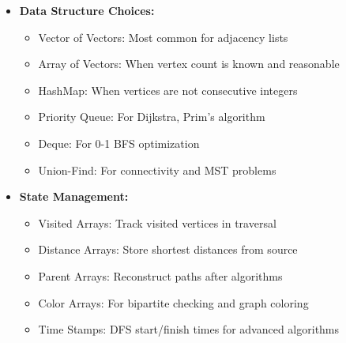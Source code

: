 \documentclass[a4paper,10pt]{book}
\begin{document}
\begin{itemize}[leftmargin=*]
    \item \textbf{Data Structure Choices:}
    \begin{itemize}
        \item Vector of Vectors: Most common for adjacency lists
        \item Array of Vectors: When vertex count is known and reasonable
        \item HashMap: When vertices are not consecutive integers
        \item Priority Queue: For Dijkstra, Prim’s algorithm
        \item Deque: For 0-1 BFS optimization
        \item Union-Find: For connectivity and MST problems
    \end{itemize}

    \item \textbf{State Management:}
    \begin{itemize}
        \item Visited Arrays: Track visited vertices in traversal
        \item Distance Arrays: Store shortest distances from source
        \item Parent Arrays: Reconstruct paths after algorithms
        \item Color Arrays: For bipartite checking and graph coloring
        \item Time Stamps: DFS start/finish times for advanced algorithms
    \end{itemize}
\end{itemize}
\end{document}

